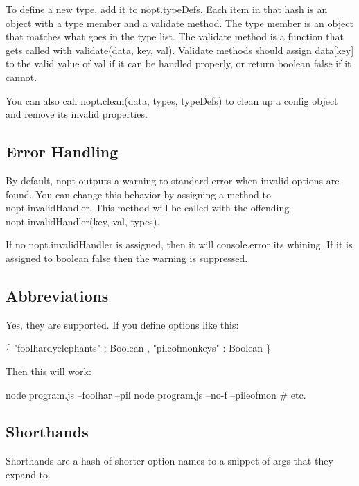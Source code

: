 To define a new type, add it to {\ttfamily nopt.\+type\+Defs}. Each item in that hash is an object with a {\ttfamily type} member and a {\ttfamily validate} method. The {\ttfamily type} member is an object that matches what goes in the type list. The {\ttfamily validate} method is a function that gets called with {\ttfamily validate(data, key, val)}. Validate methods should assign {\ttfamily data\mbox{[}key\mbox{]}} to the valid value of {\ttfamily val} if it can be handled properly, or return boolean {\ttfamily false} if it cannot.

You can also call {\ttfamily nopt.\+clean(data, types, type\+Defs)} to clean up a config object and remove its invalid properties.

\subsection*{Error Handling}

By default, nopt outputs a warning to standard error when invalid options are found. You can change this behavior by assigning a method to {\ttfamily nopt.\+invalid\+Handler}. This method will be called with the offending {\ttfamily nopt.\+invalid\+Handler(key, val, types)}.

If no {\ttfamily nopt.\+invalid\+Handler} is assigned, then it will console.\+error its whining. If it is assigned to boolean {\ttfamily false} then the warning is suppressed.

\subsection*{Abbreviations}

Yes, they are supported. If you define options like this\+:


\begin{DoxyCode}
\{ "foolhardyelephants" : Boolean
, "pileofmonkeys" : Boolean \}
\end{DoxyCode}


Then this will work\+:


\begin{DoxyCode}
node program.js --foolhar --pil
node program.js --no-f --pileofmon
# etc.
\end{DoxyCode}


\subsection*{Shorthands}

Shorthands are a hash of shorter option names to a snippet of args that they expand to.

